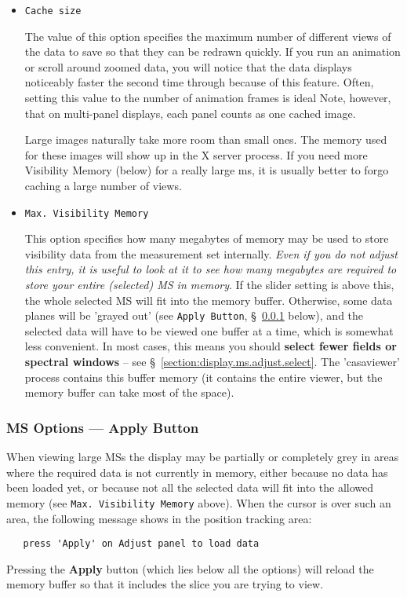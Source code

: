 \begin{itemize}

\item {\tt Cache size}

The value of this option specifies the maximum
number of different views of the data to save so that they
can be redrawn quickly.  If you run an animation or scroll around
zoomed data, you will notice that the data displays noticeably faster
the second time through because of this feature.  Often, setting this
value to the number of animation frames is ideal  Note, however, that
on multi-panel displays, each panel counts as one cached image.

Large images naturally take more room than small ones.  The memory used
for these images will show up in the X server process.  If you need more
Visibility Memory (below) for a really large ms, it is usually better to
forgo caching a large number of views.

\item {\tt Max. Visibility Memory}

This option specifies how many megabytes of memory may be used to store
visibility data from the measurement set internally.  {\it Even if you do
not adjust this entry, it is useful to look at it to see how many megabytes
are required to store your entire (selected) MS in memory}.  If the slider
setting is above this, the whole selected MS will fit into the memory
buffer.  Otherwise, some data planes will be 'grayed out' (see 
{\tt Apply Button}, \S~\ref{section:display.ms.adjust.apply} below),
and the selected
data will have to be viewed one buffer at a time, which is somewhat less 
convenient. In most cases, this means you should {\bf select fewer fields
or spectral windows} -- see \S~\ref{section:display.ms.adjust.select}.
The 'casaviewer' process contains this buffer memory (it contains the entire
viewer, but the memory buffer can take most of the space).

\end{itemize}

\subsubsection{MS Options --- Apply Button}
\label{section:display.ms.adjust.apply}

When viewing large MSs the display may be 
partially or completely grey in areas where the required data is not
currently in memory, either because no data has been loaded yet, or
because not all the selected data will fit into the allowed memory
(see {\tt Max. Visibility Memory} above).  When the
cursor is over such an area, the following message shows in the position
tracking area:
\small
\begin{verbatim}
   press 'Apply' on Adjust panel to load data
\end{verbatim}
\normalsize
Pressing the {\bf Apply} button (which lies below all the options) 
will reload the
memory buffer so that it includes the slice you are trying to view.

